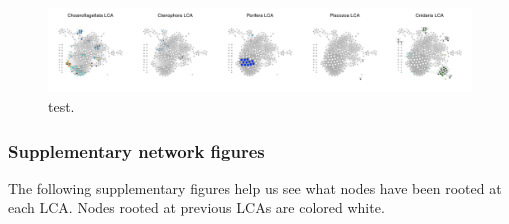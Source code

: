 \begin{Shaded}
\begin{Highlighting}[]
\CommentTok{# )}
\end{Highlighting}
\end{Shaded}

\clearpage

\begin{figure}
\centering
\includegraphics[width=1\textwidth,height=\textheight]{figs/analysis.network.fig4_raw-1}
\caption{test.}
\end{figure}

\clearpage

\hypertarget{supplementary-network-figures}{%
\subsubsection{Supplementary network
figures}\label{supplementary-network-figures}}

The following supplementary figures help us see what nodes have been
rooted at each LCA. Nodes rooted at previous LCAs are colored white.

